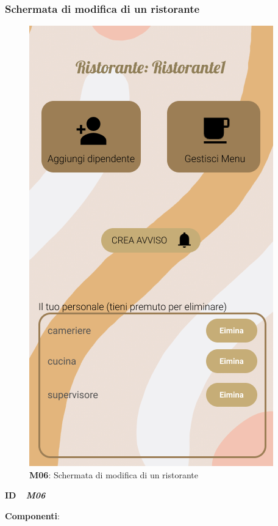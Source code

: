         \subsubsection{Schermata di modifica di un ristorante}
        \begin{figure}[H]
            \centering
            \includegraphics[scale=0.4]{assets/diagrammi/Mockup/Mockup_ResturantDash.png}
            \caption{\textbf{M06}: Schermata di modifica di un ristorante}\label{fig:Mockup_ResturantManager}
        \end{figure}
        \begin{flushleft}
            \textbf{ID} \ \Large{ \emph{\textbf{M06}}}
        \end{flushleft}

        \textbf{Componenti}:


